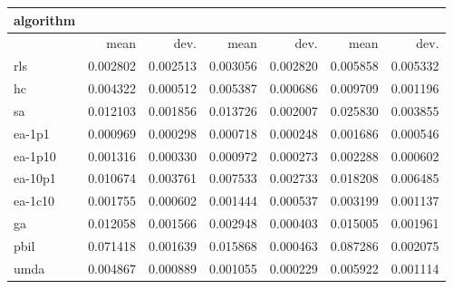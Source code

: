 \begin{tabular}{@{}l*{6}{>{{}}N{1}{2}}@{}}
\toprule
{algorithm} &  &  &  \\
\midrule
& {mean} & {dev.} & {mean} & {dev.} & {mean} & {dev.} \\
\midrule
rls & 0.002802 & 0.002513 & 0.003056 & 0.002820 & 0.005858 & 0.005332 \\
 hc & 0.004322 & 0.000512 & 0.005387 & 0.000686 & 0.009709 & 0.001196 \\
 sa & 0.012103 & 0.001856 & 0.013726 & 0.002007 & 0.025830 & 0.003855 \\
 ea-1p1 & 0.000969 & 0.000298 & 0.000718 & 0.000248 & 0.001686 & 0.000546 \\
 ea-1p10 & 0.001316 & 0.000330 & 0.000972 & 0.000273 & 0.002288 & 0.000602 \\
 ea-10p1 & 0.010674 & 0.003761 & 0.007533 & 0.002733 & 0.018208 & 0.006485 \\
 ea-1c10 & 0.001755 & 0.000602 & 0.001444 & 0.000537 & 0.003199 & 0.001137 \\
 ga & 0.012058 & 0.001566 & 0.002948 & 0.000403 & 0.015005 & 0.001961 \\
 pbil & 0.071418 & 0.001639 & 0.015868 & 0.000463 & 0.087286 & 0.002075 \\
 umda & 0.004867 & 0.000889 & 0.001055 & 0.000229 & 0.005922 & 0.001114 \\
 \bottomrule
\end{tabular}
